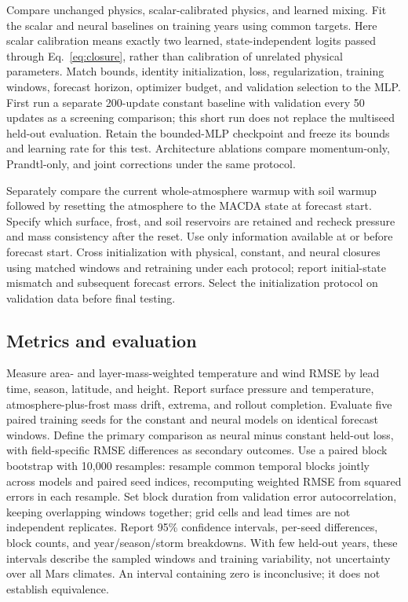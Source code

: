\documentclass{article}
\begin{document}
Compare unchanged physics, scalar-calibrated physics, and learned mixing.
Fit the scalar and neural baselines on training years using common targets.
Here scalar calibration means exactly two learned, state-independent logits
passed through Eq.~\ref{eq:closure}, rather than calibration of unrelated
physical parameters. Match bounds, identity initialization, loss,
regularization, training windows, forecast horizon, optimizer budget, and
validation selection to the MLP. First run a separate 200-update constant
baseline with validation every 50 updates as a screening comparison; this
short run does not replace the multiseed held-out evaluation. Retain the
bounded-MLP checkpoint and freeze its bounds and learning rate for this test.
Architecture ablations compare momentum-only, Prandtl-only, and joint
corrections under the same protocol.

Separately compare the current whole-atmosphere warmup with soil warmup
followed by resetting the atmosphere to the MACDA state at forecast start.
Specify which surface, frost, and soil reservoirs are retained and recheck
pressure and mass consistency after the reset. Use only information available
at or before forecast start. Cross initialization with physical, constant,
and neural closures using matched windows and retraining under each protocol;
report initial-state mismatch and subsequent forecast errors. Select the
initialization protocol on validation data before final testing.

\subsection{Metrics and evaluation}
Measure area- and layer-mass-weighted temperature and wind RMSE by lead time,
season, latitude, and height. Report surface pressure and temperature,
atmosphere-plus-frost mass drift, extrema, and rollout completion. Evaluate
five paired training seeds for the constant and neural models on identical
forecast windows. Define the primary comparison as neural minus constant
held-out loss, with field-specific RMSE differences as secondary outcomes.
Use a paired block bootstrap with 10,000 resamples: resample common temporal
blocks jointly across models and paired seed indices, recomputing weighted
RMSE from squared errors in each resample. Set block duration from validation
error autocorrelation, keeping overlapping windows together; grid cells and
lead times are not independent replicates. Report 95\% confidence intervals,
per-seed differences, block counts, and year/season/storm breakdowns. With
few held-out years, these intervals describe the sampled windows and training
variability, not uncertainty over all Mars climates. An interval containing
zero is inconclusive; it does not establish equivalence.
\end{document}
